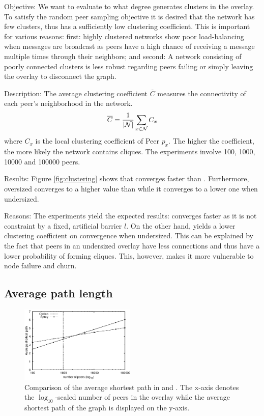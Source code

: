 \begin{asparadesc}
\item[Objective:] We want to evaluate to what degree \SCAMPLON{} generates
  clusters in the overlay.  To satisfy the random peer sampling objective it is
  desired that the network has few clusters, thus has a sufficiently low
  clustering coefficient.  This is important for various reasons: first: highly
  clustered networks show poor load-balancing when messages are broadcast as
  peers have a high chance of receiving a message multiple times through their
  neighbors; and second: A network consisting of poorly connected clusters is
  less robust regarding peers failing or simply leaving the overlay to
  disconnect the graph.
\item[Description:] The average clustering coefficient $\overline{C}$ measures
  the connectivity of each peer's neighborhood in the network.
  \begin{equation}
    \overline{C} = {1\over |\mathcal{N}|}\sum\limits_{x\in\mathcal{N}}C_x
  \end{equation}
  where $C_x$ is the local clustering coefficient of Peer $p_x$. The higher the
  coefficient, the more likely the network contains cliques.  The experiments
  involve 100, 1000, 10000 and 100000 peers.
\item[Results:] Figure \ref{fig:clustering} shows that \SCAMPLON{} converges
  faster than \CYCLON{}.  Furthermore, oversized \CYCLON{} converges to a
  higher value than \SCAMPLON while it converges to a lower one when
  undersized.
\item[Reasons:] The experiments yield the expected results: \SCAMPLON{}
  converges faster as it is not constraint by a fixed, artificial barrier
  $l$.  On the other hand, \CYCLON{} yields a lower clustering coefficient on
  convergence when undersized.  This can be explained by the fact that peers in
  an undersized \CYCLON{} overlay have less connections and thus have a lower
  probability of forming cliques.  This, however, makes it more vulnerable to
  node failure and churn.
\end{asparadesc}

\subsection{Average path length}
\label{subsec:avg}
\begin{figure}
  \centering
  \includegraphics[width=0.49\textwidth]{img/avgpath.eps}
  \caption{\label{fig:avgpath}Comparison of the average shortest path in \SCAMPLON{}
      and \CYCLON{}. The x-axis denotes the $\log_{10}$-scaled number of peers in 
      the overlay while the average shortest path of the graph is displayed on the 
  y-axis.}
\end{figure}

